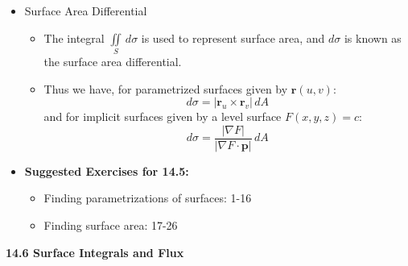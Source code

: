 \documentclass[12pt]{article}
\theoremstyle{plain}
\theoremstyle{definition}
\theoremstyle{remark}
\newcommand{\vect}[1]{\mathbf{#1}}
\begin{document}
\begin{itemize}
	\item Surface Area Differential
	
		\begin{itemize}
		\item The integral $\iint\limits_S\, d\sigma$ is used to represent surface area, and $d\sigma$ is known as the surface area differential.
		\item Thus we have, for parametrized surfaces given by $\vect{r}(u,v)$: \[d\sigma = |\vect{r}_u\times\vect{r}_v|\,dA\] and for implicit surfaces given by a  level surface $F(x,y,z)=c$: \[d\sigma = \frac{|\nabla F|}{|\nabla F \cdot \vect{p}|}\,dA\]
		\end{itemize}
				
	\item \textbf{Suggested Exercises for 14.5:}
	
		\begin{itemize}
		\item Finding parametrizations of surfaces: 1-16
		\item Finding surface area: 17-26
		\end{itemize}
		
	\end{itemize}
	
	\newpage
	
	\centerline{\bf 14.6 Surface Integrals and Flux}
	
\end{document}
